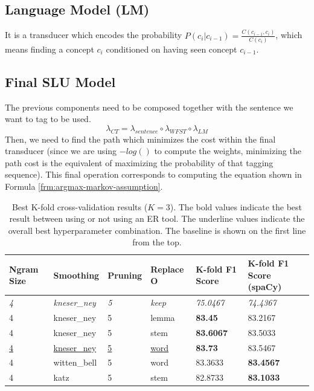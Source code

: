 \documentclass[11pt,a4paper]{article}
\begin{document}
\subsection{Language Model (LM)}
It is a transducer which encodes the probability $P(c_i|c_{i-1}) = \frac{C(c_{i-1}, c_i)}{C(c_i)}$, which means finding a concept $c_i$ conditioned on having seen concept $c_{i-1}$. 

\subsection{Final SLU Model}

The previous components need to be composed together with the sentence we want to tag to be used.
\begin{equation}
\lambda_{CT} = \lambda_{sentence} \circ \lambda_{WFST} \circ \lambda_{LM}
\end{equation}
Then, we need to find the path which minimizes the cost within the final transducer (since we are using $-log()$ to compute the weights, minimizing the path cost is the equivalent of maximizing the probability of that tagging sequence). This final operation corresponds to computing the equation shown in Formula \ref{frm:argmax-markov-assumption}.


\begin{table}[th!]
\centering
\caption{Best K-fold cross-validation results ($K=3$). The bold values indicate the best result between using or not using an ER tool. The underline values indicate the overall best hyperparameter combination. The baseline is shown on the first line from the top.}
\label{tab:eval-resuts}
\begin{tabular}{llllll}
\textbf{Ngram Size} & \textbf{Smoothing} & \textbf{Pruning} & \textbf{Replace O} & \textbf{K-fold F1 Score} & \textbf{K-fold F1 Score (spaCy)} \\ \hline
\textit{4} & \textit{kneser\_ney} & \textit{5} & \textit{keep} & \textit{75.0467} & \textit{74.4367} \\ \hline
4 & kneser\_ney & 5 & lemma & \textbf{83.45} & 83.2167 \\
4 & kneser\_ney & 5 & stem & \textbf{83.6067} & 83.5033 \\
\underline{4} & \underline{kneser\_ney} & \underline{5} & \underline{word} & \textbf{83.73} & 83.5467 \\
4 & witten\_bell & 5 & word & 83.3633 & \textbf{83.4567} \\
4 & katz & 5 & stem & 82.8733 & \textbf{83.1033}
\end{tabular}
\end{table}
\end{document}
